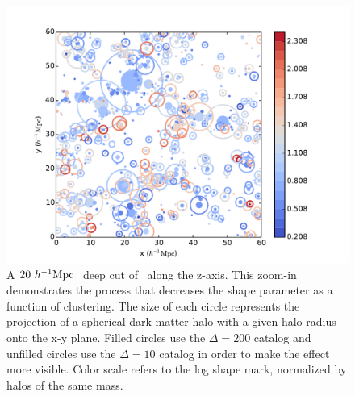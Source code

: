 \documentclass[usenatbib,usegraphicx,letterpaper]{mn2e}
\begin{document}
\begin{figure}
	\centering
	\includegraphics[width=.9\textwidth]{plotcircles_coolwarm.pdf}
	\caption{A $20 \ h^{-1}\mathrm{Mpc}~$ deep cut of \simB \ along the z-axis. This zoom-in demonstrates the process that decreases the shape parameter as a function of clustering. The size of each circle represents the projection of a spherical dark matter halo with a given halo radius onto the x-y plane. Filled circles use the $\Delta = 200$ catalog and unfilled circles use the $\Delta = 10$ catalog in order to make the effect more visible. Color scale refers to the log shape mark, normalized by halos of the same mass.}
	\label{fig:plotcircles}
\end{figure}

\end{document}
